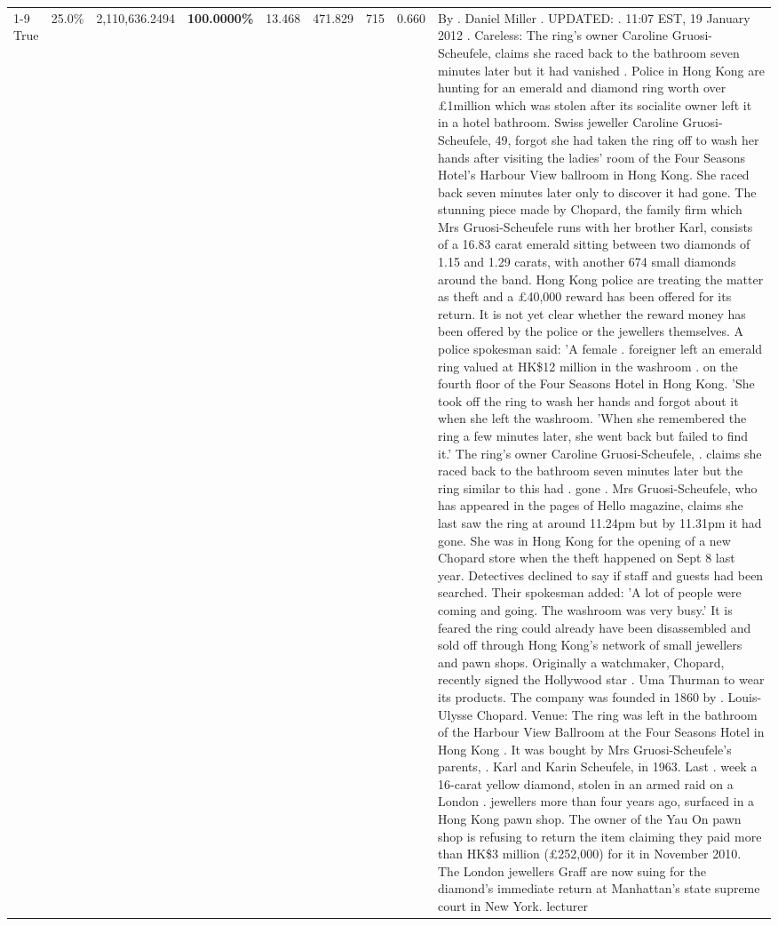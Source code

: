 \begin{table}[H]
\begin{tabular}{lllrlllll}
\cline{1-9}
True & 25.0\% & 2,110,636.2494 & \bfseries \color{red} 100.0000\% & 13.468 & 471.829 & 715 & 0.660 & By . Daniel Miller . UPDATED: . 11:07 EST, 19 January 2012 . Careless: The ring's owner Caroline Gruosi-Scheufele, claims she raced back to the bathroom seven minutes later but it had vanished . Police in Hong Kong are hunting for an emerald and diamond ring worth over £1million which was stolen after its socialite owner left it in a hotel bathroom. Swiss jeweller Caroline Gruosi-Scheufele, 49, forgot she had taken the ring off to wash her hands after visiting the ladies' room of the Four Seasons Hotel's Harbour View ballroom in Hong Kong. She raced back seven minutes later only to discover it had gone. The stunning piece made by Chopard, the family firm which Mrs Gruosi-Scheufele runs with her brother Karl, consists of a 16.83 carat emerald sitting between two diamonds of 1.15 and 1.29 carats, with another 674 small diamonds around the band. Hong Kong police are treating the matter as theft and a £40,000 reward has been offered for its return. It is not yet clear whether the reward money has been offered by the police or the jewellers themselves. A police spokesman said: 'A female . foreigner left an emerald ring valued at HK\$12 million in the washroom . on the fourth floor of the Four Seasons Hotel in Hong Kong. 'She took off the ring to wash her hands and forgot about it when she left the washroom. 'When she remembered the ring a few minutes later, she went back but failed to find it.' The ring's owner Caroline Gruosi-Scheufele, . claims she raced back to the bathroom seven minutes later but the ring similar to this had . gone . Mrs Gruosi-Scheufele, who has appeared in the pages of Hello magazine, claims she last saw the ring at around 11.24pm but by 11.31pm it had gone. She was in Hong Kong for the opening of a new Chopard store when the theft happened on Sept 8 last year. Detectives declined to say if staff and guests had been searched. Their spokesman added: 'A lot of people were coming and going. The washroom was very busy.' It is feared the ring could already have been disassembled and sold off through Hong Kong's network of small jewellers and pawn shops. Originally a watchmaker, Chopard, recently signed the Hollywood star . Uma Thurman to wear its products. The company was founded in 1860 by . Louis-Ulysse Chopard. Venue: The ring was left in the bathroom of the Harbour View Ballroom at the Four Seasons Hotel in Hong Kong . It was bought by Mrs Gruosi-Scheufele's  parents, . Karl and Karin Scheufele, in 1963. Last . week a 16-carat yellow diamond, stolen in an armed raid on a London . jewellers more than four years ago, surfaced in a Hong Kong pawn shop. The owner of the Yau On pawn shop is refusing to return the item claiming they paid more than HK\$3 million (£252,000) for it in November 2010. The London jewellers Graff are now suing for the diamond’s immediate return at Manhattan’s state supreme court in New York. lecturer \\

\end{tabular}
\end{table}
